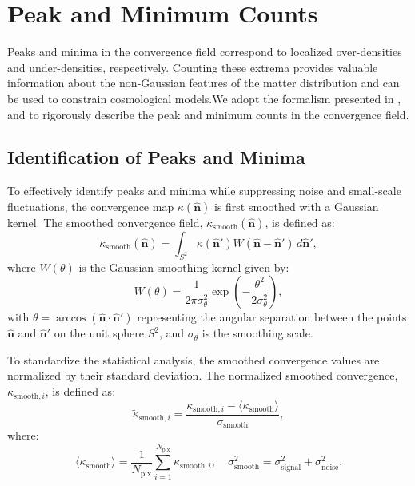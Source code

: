 \section{Peak and Minimum Counts} 
\label{sec:peak_min_counts}
Peaks and minima in the convergence field correspond to localized over-densities and under-densities, respectively. Counting these extrema provides valuable information about the non-Gaussian features of the matter distribution and can be used to constrain cosmological models.We adopt the formalism presented in \citet{1986ApJ...304...15B}, \citet{2016MNRAS.463.3653K} and \citet{2018MNRAS.474..712M} to rigorously describe the peak and minimum counts in the convergence field.

\subsection{Identification of Peaks and Minima}
To effectively identify peaks and minima while suppressing noise and small-scale fluctuations, the convergence map $\kappa(\hat{\mathbf{n}})$ is first smoothed with a Gaussian kernel. The smoothed convergence field, $\kappa_{\mathrm{smooth}}(\hat{\mathbf{n}})$, is defined as:
\begin{equation}
    \kappa_{\mathrm{smooth}}(\hat{\mathbf{n}}) = \int_{S^2} \kappa(\hat{\mathbf{n}}') W(\hat{\mathbf{n}} - \hat{\mathbf{n}}') \, d\hat{\mathbf{n}}',
    \label{eq:smoothing}
\end{equation}
where $W(\theta)$ is the Gaussian smoothing kernel given by:
\begin{equation}
    W(\theta) = \frac{1}{2\pi \sigma_{\theta}^2} \exp\left( -\frac{\theta^2}{2 \sigma_{\theta}^2} \right),
    \label{eq:gaussian_kernel}
\end{equation}
with $\theta = \arccos(\hat{\mathbf{n}} \cdot \hat{\mathbf{n}}')$ representing the angular separation between the points $\hat{\mathbf{n}}$ and $\hat{\mathbf{n}}'$ on the unit sphere $S^2$, and $\sigma_{\theta}$ is the smoothing scale.

To standardize the statistical analysis, the smoothed convergence values are normalized by their standard deviation. The normalized smoothed convergence, $\tilde{\kappa}_{\mathrm{smooth}, i}$, is defined as:
\begin{equation}
    \tilde{\kappa}_{\mathrm{smooth}, i} = \frac{\kappa_{\mathrm{smooth}, i} - \langle \kappa_{\mathrm{smooth}} \rangle}{\sigma_{\mathrm{smooth}}},
    \label{eq:kappa_smooth_normalized}
\end{equation}
where:
\begin{equation}
    \langle \kappa_{\mathrm{smooth}} \rangle = \frac{1}{N_{\mathrm{pix}}} \sum_{i=1}^{N_{\mathrm{pix}}} \kappa_{\mathrm{smooth}, i}, \quad \sigma_{\mathrm{smooth}}^2 = \sigma_{\mathrm{signal}}^2 + \sigma_{\mathrm{noise}}^2.
    \label{eq:normalization}
\end{equation}

